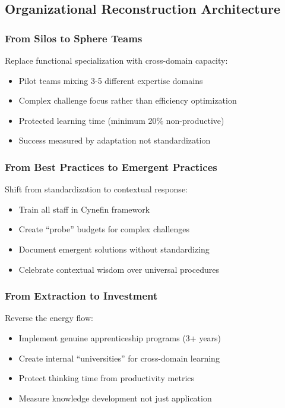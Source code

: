 \subsection{Organizational Reconstruction Architecture}

\subsubsection{From Silos to Sphere Teams}

Replace functional specialization with cross-domain capacity:
\begin{itemize}
\item Pilot teams mixing 3-5 different expertise domains
\item Complex challenge focus rather than efficiency optimization
\item Protected learning time (minimum 20\% non-productive)
\item Success measured by adaptation not standardization
\end{itemize}

\subsubsection{From Best Practices to Emergent Practices}

Shift from standardization to contextual response:
\begin{itemize}
\item Train all staff in Cynefin framework
\item Create ``probe'' budgets for complex challenges
\item Document emergent solutions without standardizing
\item Celebrate contextual wisdom over universal procedures
\end{itemize}

\subsubsection{From Extraction to Investment}

Reverse the energy flow:
\begin{itemize}
\item Implement genuine apprenticeship programs (3+ years)
\item Create internal ``universities'' for cross-domain learning
\item Protect thinking time from productivity metrics
\item Measure knowledge development not just application
\end{itemize}

